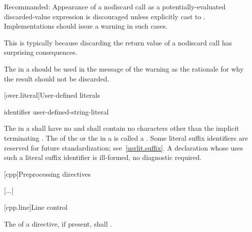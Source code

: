 \documentclass{wg21}
\begin{document}
Recommanded:
Appearance of a nodiscard call as
a potentially-evaluated discarded-value expression
is discouraged unless explicitly cast to .
Implementations should issue a warning in such cases.
\begin{note}
    This is typically because discarding the return value
    of a nodiscard call has surprising consequences.
\end{note}
The 
in a  
should be used in the message of the warning
as the rationale for why the result should not be discarded.



[over.literal]{User-defined literals}%
%

\begin{bnf}
    \br
      identifier\br
     user-defined-string-literal
\end{bnf}

\pnum
The  
in a  shall have no
 and shall contain no characters other than the
implicit terminating .
The  of the  or
the  in a  is called a
.
Some literal suffix identifiers are reserved for future standardization;
see~\ref{usrlit.suffix}.  A declaration whose  uses
such a literal suffix identifier is ill-formed, no diagnostic required.




[cpp]{Preprocessing directives}%

[...]


[cpp.line]{Line control}%
%

\pnum
The  of a
directive, if present,
shall .
\end{document}
